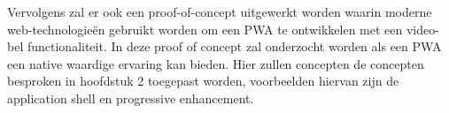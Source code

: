 Vervolgens zal er ook een proof-of-concept uitgewerkt worden waarin moderne web-technologieën gebruikt worden om een PWA te ontwikkelen met een video-bel functionaliteit. In deze proof of concept zal onderzocht worden als een PWA een native waardige ervaring kan bieden. Hier zullen concepten de concepten besproken in hoofdstuk 2 toegepast worden, voorbeelden hiervan zijn de application shell en  progressive enhancement.


